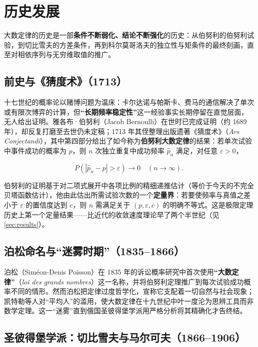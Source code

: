 \section{历史发展}\label{sec:history}

大数定律的历史是一部\textbf{条件不断弱化、结论不断强化}的历史：从伯努利的伯努利试验，到切比雪夫的方差条件，再到科尔莫哥洛夫的独立性与矩条件的最终刻画，直至对相依序列与无穷维取值的推广。

\subsection{前史与《猜度术》（1713）}

十七世纪的概率论以赌博问题为温床：卡尔达诺与帕斯卡、费马的通信解决了单次或有限次博弈的计算，但\textbf{“长期频率稳定性”}这一经验事实长期停留在直觉层面，无人给出证明。雅各布·伯努利（Jacob Bernoulli）在世时已完成证明（约 1689 年），却反复打磨至去世仍未定稿；1713 年其侄整理出版遗著《猜度术》（\textit{Ars Conjectandi}）\cite{bernoulli1713}，其中第四部分给出了如今称为\textbf{伯努利大数定律}的结果：若单次试验中事件成功的概率为 $p$，则 $n$ 次独立重复中成功频率 $\hat{p}_n$ 满足，对任意 $\varepsilon > 0$，

\begin{equation}
    P\left(\left|\hat{p}_n - p\right| > \varepsilon\right) \to 0 \quad (n \to \infty).
\end{equation}

伯努利的证明基于对二项式展开中各项比例的精细递推估计（等价于今天的不完全贝塔函数估计），他由此估出所需试验次数的一个\textbf{定量界}：若要使频率与真值之差小于 $\varepsilon$ 的置信度达到 $c$，则 $n$ 需满足关于 $(p, \varepsilon, c)$ 的明确不等式。这是极限定理历史上第一个定量结果——比近代的收敛速度理论早了两个半世纪（见\cref{sec:results}）。

\subsection{泊松命名与“迷雾时期”（1835--1866）}

泊松（Sim\'eon-Denis Poisson）在 1835 年的诉讼概率研究中首次使用\textbf{“大数定律”}（\emph{loi des grands nombres}）这一名称\cite{poisson1837}，并将伯努利定理推广到每次试验成功概率不同的情形。然而泊松把定律过度哲学化，宣称它支配着一切自然与社会现象；凯特勒等人对“平均人”的滥用，使大数定律在十九世纪中叶一度沦为思辨工具而非数学定理。这一“迷雾”直到俄国圣彼得堡学派用严格分析将其精确化才告终结。

\subsection{圣彼得堡学派：切比雪夫与马尔可夫（1866--1906）}

